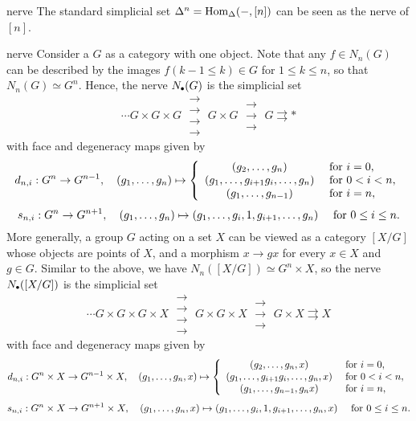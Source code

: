 \begin{example}{nerve}
    The standard simplicial set $\Delta^n = \text{Hom}_\Delta(-, [n])$ can be seen as the nerve of $[n]$.
\end{example}

\begin{example}{nerve}
    Consider a  $G$ as a category with one object. Note that any $f \in N_n(G)$ can be described by the images $f(k - 1 \le k) \in G$ for $1 \le k \le n$, so that $N_n(G) \simeq G^n$. Hence, the nerve $N_\bdot(G)$ is the simplicial set
    \[ \cdots G \times G \times G \; \substack{\rightarrow \\[-0.9em] \rightarrow \\[-0.9em] \rightarrow \\[-0.9em] \rightarrow} \; G \times G \; \substack{\rightarrow \\[-0.9em] \rightarrow \\[-0.9em] \rightarrow} \; G \rightrightarrows * \]
    with face and degeneracy maps given by
    \[ d_{n, i} : G^n \to G^{n - 1}, \quad (g_1, \ldots, g_n) \mapsto \left\{ \begin{array}{cl}
        (g_2, \ldots, g_n) & \textup{ for } i = 0, \\
        (g_1, \ldots, g_{i + 1} g_i, \ldots, g_n) & \textup{ for } 0 < i < n, \\
        (g_1, \ldots, g_{n - 1}) & \textup{ for } i = n,
    \end{array} \right. \]
    \[ s_{n, i} : G^n \to G^{n + 1}, \quad (g_1, \ldots, g_n) \mapsto (g_1, \ldots, g_i, 1, g_{i + 1}, \ldots, g_n) \quad \textup{ for } 0 \le i \le n . \]
    More generally, a group $G$ acting on a set $X$ can be viewed as a category $[X/G]$ whose objects are points of $X$, and a morphism $x \to gx$ for every $x \in X$ and $g \in G$. Similar to the above, we have $N_n([X/G]) \simeq G^n \times X$, so the nerve $N_\bdot([X/G])$ is the simplicial set
    \[ \cdots G \times G \times G \times X \; \substack{\rightarrow \\[-0.9em] \rightarrow \\[-0.9em] \rightarrow \\[-0.9em] \rightarrow} \; G \times G \times X \; \substack{\rightarrow \\[-0.9em] \rightarrow \\[-0.9em] \rightarrow} \; G \times X \rightrightarrows X \]
    with face and degeneracy maps given by
    \[ d_{n, i} : G^n \times X \to G^{n - 1} \times X, \quad (g_1, \ldots, g_n, x) \mapsto \left\{ \begin{array}{cl}
        (g_2, \ldots, g_n, x) & \textup{ for } i = 0, \\
        (g_1, \ldots, g_{i + 1} g_i, \ldots, g_n, x) & \textup{ for } 0 < i < n, \\
        (g_1, \ldots, g_{n - 1}, g_n x) & \textup{ for } i = n,
    \end{array} \right. \]
    \[ s_{n, i} : G^n \times X \to G^{n + 1} \times X, \quad (g_1, \ldots, g_n, x) \mapsto (g_1, \ldots, g_i, 1, g_{i + 1}, \ldots, g_n, x) \quad \textup{ for } 0 \le i \le n . \]
\end{example}

